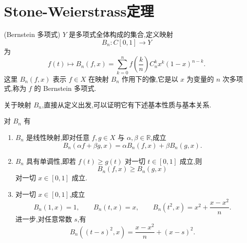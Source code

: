\section{Stone-Weierstrass定理}
\begin{definition}(Bernstein 多项式)
	$Y$ 是多项式全体构成的集合,定义映射
	\[
	B_n:C[0,1]\longrightarrow Y
	\]
	为
	\[
	f(t)\longmapsto B_n(f,x)=\sum_{k=0}^{n} f\left(\frac{k}{n}\right) C_n^k x^k(1-x)^{n-k}.
	\]
	这里 $B_n(f,x)$ 表示 $f\in X$ 在映射 $B_n$ 作用下的像,它是以 $x$ 为变量的 $n$ 次多项式,称为 $f$ 的 Bernstein 多项式.
\end{definition}

关于映射 $B_n$,直接从定义出发,可以证明它有下述基本性质与基本关系.

	对 $B_n$ 有
	\begin{enumerate}
		\item $B_n$ 是线性映射,即对任意 $f,g\in X$ 与 $\alpha,\beta\in\mathbb{R}$,成立
		\[
		B_n(\alpha f+\beta g,x)=\alpha B_n(f,x)+\beta B_n(g,x).
		\]
		\item $B_n$ 具有单调性,即若 $f(t)\geqslant g(t)$ 对一切 $t\in[0,1]$ 成立,则
		\[
		B_n(f,x)\geqslant B_n(g,x)
		\]
		对一切 $x\in[0,1]$ 成立.
		\item 对一切 $x\in[0,1]$,成立
		\[
		B_n(1,x)=1,\qquad B_n(t,x)=x,\qquad B_n(t^2,x)=x^2+\frac{x-x^2}{n}.
		\]
		进一步,对任意常数 $s$,有
		\[
		B_n((t-s)^2,x)=\frac{x-x^2}{n}+(x-s)^2.
		\]
	\end{enumerate}



